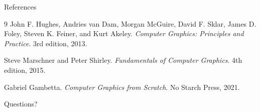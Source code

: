 \documentclass{beamer}
\begin{document}
\begin{frame}{References}
\small
\begin{thebibliography}{9}
John F. Hughes, Andries van Dam, Morgan McGuire, David F. Sklar,
James D. Foley, Steven K. Feiner, and Kurt Akeley.
\newblock \emph{Computer Graphics: Principles and Practice}.
\newblock 3rd edition, 2013.

Steve Marschner and Peter Shirley.
\newblock \emph{Fundamentals of Computer Graphics}.
\newblock 4th edition, 2015.

Gabriel Gambetta.
\newblock \emph{Computer Graphics from Scratch}.
\newblock No Starch Press, 2021.
\end{thebibliography}
\end{frame}

\begin{frame}[focus]
Questions?
\end{frame}
\end{document}
